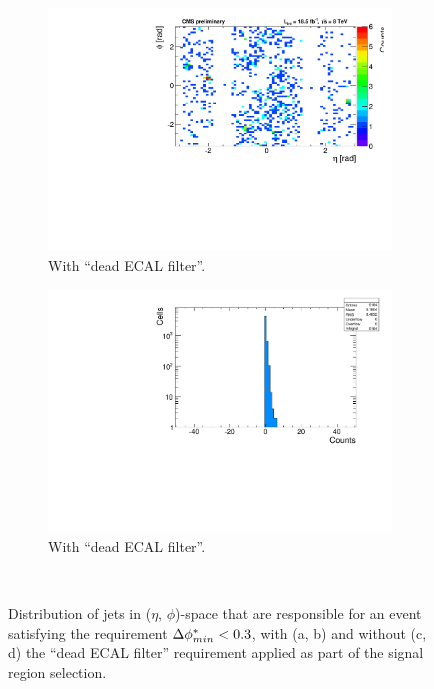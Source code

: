 \begin{figure}[h!]
\begin{center}
    \begin{subfigure}[b]{0.46\textwidth}
      \includegraphics[width=\textwidth]{Figs/dphi/Nominal_AlphaT_thresholds/th2d_numer_summed_ge2j_ge0b_200.pdf}
      \caption{With ``dead ECAL filter''.}
      \label{fig:hotspots_2d_withdeadECAL}
    \end{subfigure}
    \begin{subfigure}[b]{0.46\textwidth}
      \includegraphics[width=\textwidth]{Figs/dphi/Nominal_AlphaT_thresholds/th1d_numer_summed_ge2j_ge0b_200.pdf}
      \caption{With ``dead ECAL filter''.}
      \label{fig:hotspots_1d_withdeadECAL}
    \end{subfigure} \\ 
    \caption{Distribution of jets in ($\eta$, $\phi$)-space that are
      responsible for an event satisfying the requirement $\Delta \phi^*_{min} <
      0.3$, with (a, b) and without (c, d) the ``dead ECAL filter''
      requirement applied as part of the signal region selection.}
    \label{fig:hotspots}
  \end{center}
\end{figure}

